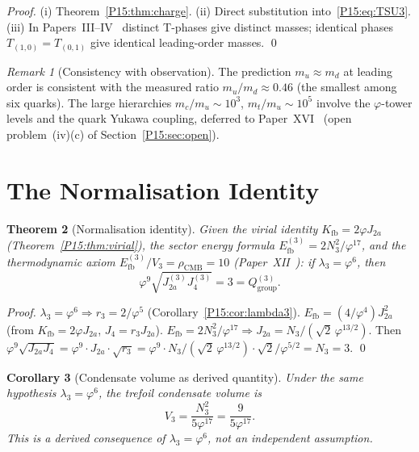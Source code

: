 \documentclass[11pt,a4paper]{article}
\newtheorem{theorem}{Theorem}[section]
\newtheorem{corollary}[theorem]{Corollary}
\theoremstyle{definition}\newtheorem{definition}[theorem]{Definition}
\theoremstyle{remark}
\newtheorem{remark}[theorem]{Remark}
\newcommand{\vp}{\varphi}
\newcommand{\lam}{\lambda}
\newcommand{\Ja}{J_{2a}}
\newcommand{\Jfour}{J_4}
\newcommand{\rCMB}{\rho_{\mathrm{CMB}}}
\newcommand{\Efb}{E_{\mathrm{fb}}}
\newcommand{\Kfb}{K_{\mathrm{fb}}}
\begin{document}
\begin{proof}
(i) Theorem~\ref{P15:thm:charge}.
(ii) Direct substitution into~\eqref{P15:eq:TSU3}.
(iii) In Papers~III--IV~\cite{Paper3,Paper4} distinct T-phases give
distinct masses; identical phases $T_{(1,0)}=T_{(0,1)}$ give
identical leading-order masses. \qed
\end{proof}

\begin{remark}[Consistency with observation]
\label{P15:rem:consistency_with_observation}
The prediction $m_u\approx m_d$ at leading order is consistent
with the measured ratio $m_u/m_d\approx 0.46$ (the smallest among six quarks).
The large hierarchies $m_c/m_u\sim10^3$, $m_t/m_u\sim10^5$
involve the $\vp$-tower levels and the quark Yukawa coupling,
deferred to Paper~XVI~\cite{Paper16} (open problem~(iv)(c) of
Section~\ref{P15:sec:open}).
\end{remark}

\section{The Normalisation Identity}
\label{P15:sec:norm}

\begin{theorem}[Normalisation identity]
\label{P15:thm:norm3}
Given the virial identity $\Kfb=2\vp\Ja$ (Theorem~\ref{P15:thm:virial}),
the sector energy formula $\Efb^{(3)}=2N_3^2/\vp^{17}$, and the
thermodynamic axiom $\Efb^{(3)}/V_3=\rCMB=10$ (Paper~XII~\cite{Paper12}):
if $\lam_3=\vp^6$, then
\begin{equation}
  \boxed{\vp^9\sqrt{\Ja^{(3)}\Jfour^{(3)}}
  = 3 = Q_{\mathrm{group}}^{(3)}.}
  \label{P15:eq:norm3}
\end{equation}
\end{theorem}

\begin{proof}
$\lam_3=\vp^6 \Rightarrow r_3=2/\vp^5$
(Corollary~\ref{P15:cor:lambda3}).
$\Efb=(4/\vp^4)\Ja^2$
(from $\Kfb=2\vp\Ja$, $\Jfour=r_3\Ja$).
$\Efb=2N_3^2/\vp^{17} \Rightarrow \Ja=N_3/(\sqrt{2}\,\vp^{13/2})$.
Then
$\vp^9\sqrt{\Ja\Jfour}=\vp^9\cdot\Ja\cdot\sqrt{r_3}
=\vp^9\cdot N_3/(\sqrt{2}\,\vp^{13/2})\cdot\sqrt{2}/\vp^{5/2}
=N_3=3$.
\qed
\end{proof}

\begin{corollary}[Condensate volume as derived quantity]
\label{P15:cor:V3}
Under the same hypothesis $\lam_3=\vp^6$,
the trefoil condensate volume is
\begin{equation}
  V_3 = \frac{N_3^2}{5\vp^{17}} = \frac{9}{5\vp^{17}}.
  \label{P15:eq:V3}
\end{equation}
This is a \emph{derived consequence} of $\lam_3=\vp^6$,
not an independent assumption.
\end{corollary}
\end{document}
